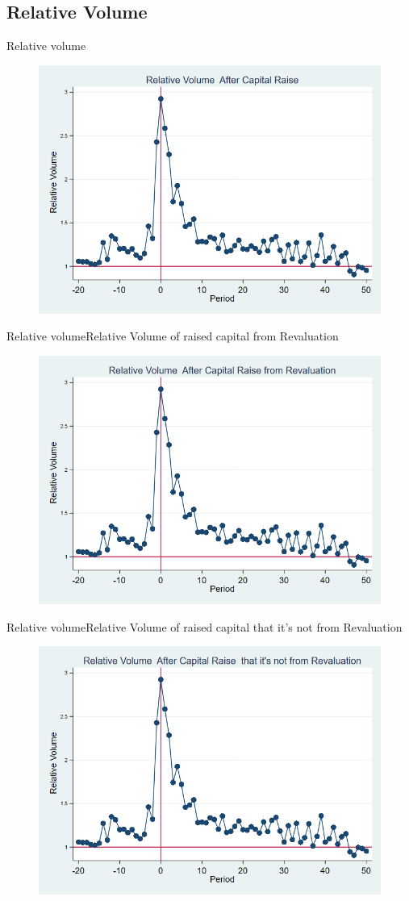\documentclass{beamer}
\begin{document}
	
	\subsection{Relative Volume}
	\begin{frame}{Relative volume}
		\begin{figure}
			\centering
			\includegraphics[width=0.7\linewidth]{Output/Relvolume.png}
			\label{fig:relvolume}
		\end{figure}
	\end{frame}
	\begin{frame}{Relative volume}{Relative Volume of raised capital from Revaluation}
		\begin{figure}
			\centering
			\includegraphics[width=0.7\linewidth]{Output/Relvolume_Revaluation.png}
			\label{fig:relvolumerevaluation}
		\end{figure}
	\end{frame}
	\begin{frame}{Relative volume}{Relative Volume of raised capital that it's not from Revaluation}
		\begin{figure}
			\centering
			\includegraphics[width=0.7\linewidth]{Output/Relvolume_NoRevaluation.png}
			\label{fig:relvolumenorevaluation}
		\end{figure}
	\end{frame}
	
\end{document}
